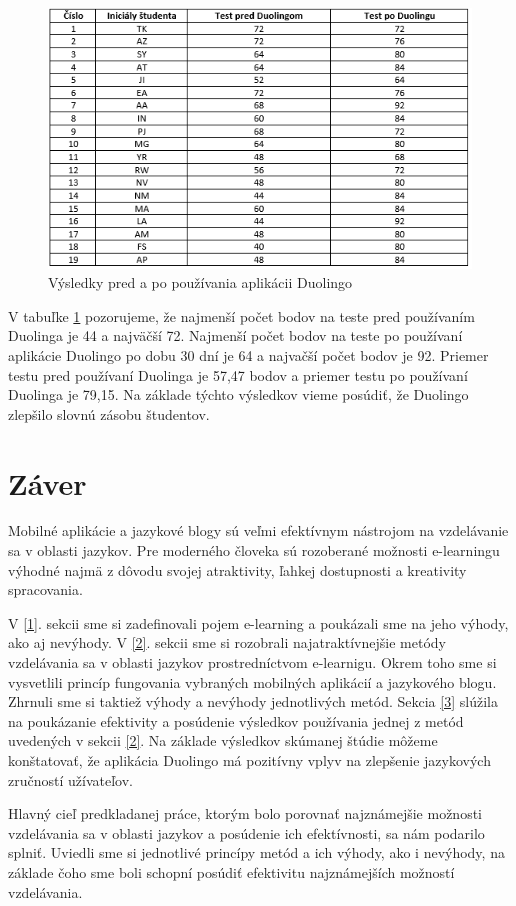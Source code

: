\documentclass[10pt,oneside,slovak,a4paper]{article}
\begin{document}
\begin{figure}[h] %
\centering
\includegraphics{duo_studium.png}
\caption{Výsledky pred a po používania aplikácii Duolingo\cite{duolingo}}
\label{duo-studium}
\end{figure}

V tabuľke \ref{duo-studium} pozorujeme, že najmenší počet bodov na teste pred používaním Duolinga je 44 a najväčší 72. Najmenší počet bodov na teste po používaní aplikácie  Duolingo po dobu 30 dní je 64 a najvačší počet bodov je 92. Priemer testu pred používaní Duolinga je 57,47 bodov a priemer testu po používaní Duolinga je 79,15. \cite{duolingo} Na základe týchto výsledkov vieme posúdiť, že Duolingo zlepšilo slovnú zásobu študentov.

\section*{Záver}
Mobilné aplikácie a jazykové blogy sú veľmi efektívnym nástrojom na vzdelávanie sa v oblasti jazykov. Pre moderného človeka sú rozoberané možnosti e-learningu výhodné najmä z dôvodu svojej atraktivity, ľahkej dostupnosti a kreativity spracovania.

V \ref{1}. sekcii sme si zadefinovali pojem e-learning a poukázali sme na jeho výhody, ako aj nevýhody. V \ref{2}. sekcii sme si rozobrali najatraktívnejšie metódy vzdelávania sa v oblasti jazykov prostredníctvom e-learnigu. Okrem toho sme si vysvetlili princíp fungovania vybraných mobilných aplikácií a jazykového blogu. Zhrnuli sme si taktiež výhody a nevýhody jednotlivých metód. Sekcia \ref{3} slúžila na poukázanie efektivity a posúdenie výsledkov používania jednej z metód uvedených v sekcii \ref{2}. Na základe výsledkov skúmanej štúdie môžeme konštatovať, že aplikácia Duolingo má pozitívny vplyv na zlepšenie jazykových zručností užívateľov. 

Hlavný cieľ predkladanej práce, ktorým bolo porovnať najznámejšie možnosti vzdelávania sa v oblasti jazykov a posúdenie ich efektívnosti, sa nám podarilo splniť. Uviedli sme si jednotlivé princípy metód a ich výhody, ako i nevýhody, na základe čoho sme boli schopní posúdiť efektivitu najznámejších možností vzdelávania.



\end{document}
